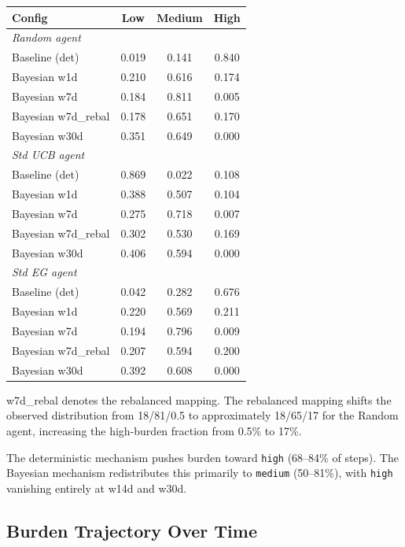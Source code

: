 \documentclass[11pt,a4paper]{article}
\begin{document}
\begin{center}
\begin{tabular}{l ccc}
\toprule
Config & Low & Medium & High \\
\midrule
\multicolumn{4}{l}{\textit{Random agent}} \\
\quad Baseline (det) & 0.019 & 0.141 & 0.840 \\
\quad Bayesian w1d   & 0.210 & 0.616 & 0.174 \\
\quad Bayesian w7d   & 0.184 & 0.811 & 0.005 \\
\quad Bayesian w7d\_rebal  & 0.178 & 0.651 & 0.170 \\
\quad Bayesian w30d  & 0.351 & 0.649 & 0.000 \\
\midrule
\multicolumn{4}{l}{\textit{Std UCB agent}} \\
\quad Baseline (det) & 0.869 & 0.022 & 0.108 \\
\quad Bayesian w1d   & 0.388 & 0.507 & 0.104 \\
\quad Bayesian w7d   & 0.275 & 0.718 & 0.007 \\
\quad Bayesian w7d\_rebal  & 0.302 & 0.530 & 0.169 \\
\quad Bayesian w30d  & 0.406 & 0.594 & 0.000 \\
\midrule
\multicolumn{4}{l}{\textit{Std EG agent}} \\
\quad Baseline (det) & 0.042 & 0.282 & 0.676 \\
\quad Bayesian w1d   & 0.220 & 0.569 & 0.211 \\
\quad Bayesian w7d   & 0.194 & 0.796 & 0.009 \\
\quad Bayesian w7d\_rebal  & 0.207 & 0.594 & 0.200 \\
\quad Bayesian w30d  & 0.392 & 0.608 & 0.000 \\
\bottomrule
\end{tabular}
\end{center}

\noindent w7d\_rebal denotes the rebalanced mapping.  The rebalanced mapping
shifts the observed distribution from 18/81/0.5 to approximately 18/65/17
for the Random agent, increasing the high-burden fraction from 0.5\% to
17\%.

\noindent The deterministic mechanism pushes burden toward \texttt{high}
(68--84\% of steps).  The Bayesian mechanism redistributes this primarily
to \texttt{medium} (50--81\%), with \texttt{high} vanishing entirely at
w14d and w30d.

\subsection{Burden Trajectory Over Time}
\end{document}
